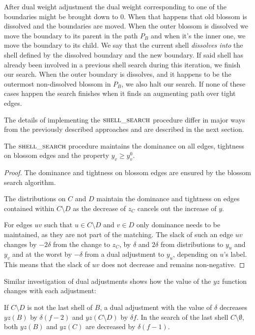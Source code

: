 After dual weight adjustment the dual weight corresponding to one of the boundaries might be brought down to $0$. When that happens that old blossom is dissolved and the boundaries are moved. When the outer blossom is dissolved we move the boundary to its parent in the path $P_B$ and when it's the inner one, we move the boundary to its child. We say that the current shell \textit{dissolves into} the shell defined by the dissolved boundary and the new boundary. If said shell has already been involved in a previous shell search during this iteration, we finish our search. When the outer boundary is dissolves, and it happens to be the outermost non-dissolved blossom in $P_B$, we also halt our search. If none of these cases happen the search finishes when it finds an augmenting path over tight edges.

The details of implementing the $\textsc{shell\_search}$ procedure differ in major ways from the previously described approaches and are described in the next section.

\begin{lemma}\label{lem:search_correctness}
    The $\textsc{shell\_search}$ procedure maintains the dominance on all edges, tightness on blossom edges and the property $y_v \geq y^0_v$.
\end{lemma}

\begin{proof}
    The dominance and tightness on blossom edges are ensured by the blossom search algorithm. 
    
    The distributions on $C$ and $D$ maintain the dominance and tightness on edges contained within $C \setminus D$ as the decrease of $z_C$ cancels out the increase of $y$. 
    
    For edges $uv$ such that $u \in C \setminus D$ and $v \in D$ only dominance needs to be maintained, as they are not part of the matching. The slack of such an edge $uv$ changes by $-2\delta$ from the change to $z_C$, by $\delta$ and $2\delta$ from distributions to $y_u$ and $y_v$ and at the worst by $-\delta$ from a dual adjustment to $y_u$, depending on $u$'s label. This means that the slack of $uv$ does not decrease and remains non-negative.
\end{proof}

Similar investigation of dual adjustments shows how the value of the $yz$ function changes with each adjustment:

\begin{lemma}\label{lem:search_duals}
    If $C \setminus D$ is not the last shell of $B$, a dual adjustment with the value of $\delta$ decreases $yz(B)$ by $\delta(f-2)$ and $yz(C \setminus D)$ by $\delta f$. In the search of the last shell $C \setminus \emptyset$, both $yz(B)$ and $yz(C)$ are decreased by $\delta(f-1)$.
\end{lemma}


